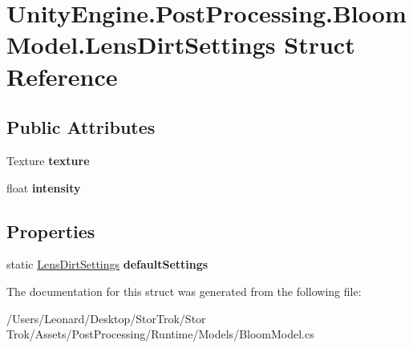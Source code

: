 \hypertarget{struct_unity_engine_1_1_post_processing_1_1_bloom_model_1_1_lens_dirt_settings}{}\section{Unity\+Engine.\+Post\+Processing.\+Bloom\+Model.\+Lens\+Dirt\+Settings Struct Reference}
\label{struct_unity_engine_1_1_post_processing_1_1_bloom_model_1_1_lens_dirt_settings}
\subsection*{Public Attributes}
\begin{DoxyCompactItemize}
\item 
\mbox{\label{struct_unity_engine_1_1_post_processing_1_1_bloom_model_1_1_lens_dirt_settings_a49f3c63b8474a37689597b9dda3bc026}} 
Texture {\bfseries texture}
\item 
\mbox{\label{struct_unity_engine_1_1_post_processing_1_1_bloom_model_1_1_lens_dirt_settings_abad6ccaf7daa6d25b6561005934f80c2}} 
float {\bfseries intensity}
\end{DoxyCompactItemize}
\subsection*{Properties}
\begin{DoxyCompactItemize}
\item 
\mbox{\label{struct_unity_engine_1_1_post_processing_1_1_bloom_model_1_1_lens_dirt_settings_ad206ec5b45a4c02bb502139d76e56a9c}} 
static \hyperlink{struct_unity_engine_1_1_post_processing_1_1_bloom_model_1_1_lens_dirt_settings}{Lens\+Dirt\+Settings} {\bfseries default\+Settings}
\end{DoxyCompactItemize}


The documentation for this struct was generated from the following file\+:\begin{DoxyCompactItemize}
\item 
/\+Users/\+Leonard/\+Desktop/\+Stor\+Trok/\+Stor Trok/\+Assets/\+Post\+Processing/\+Runtime/\+Models/Bloom\+Model.\+cs\end{DoxyCompactItemize}
